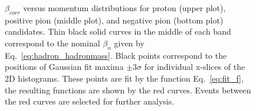 \begin{figure}[htp]
\begin{center}
\caption{\small $\beta_{corr}$ versus momentum distributions for proton (upper plot), positive pion (middle plot), and negative pion (bottom plot) candidates. Thin black solid curves in the middle of each band correspond to the nominal $\beta_{n}$ given by Eq.~\eqref{eq:hadron_hadronmass}. Black points correspond to the positions of Gaussian fit maxima $\pm 3\sigma$ for individual x-slices of the 2D histograms. These points are fit by the function Eq.~\eqref{eq:fit_f}, the resulting functions are shown by the red curves. Events between the red curves are selected for further analysis. \label{fig:hadron_id}} 
\end{center}
\end{figure}

